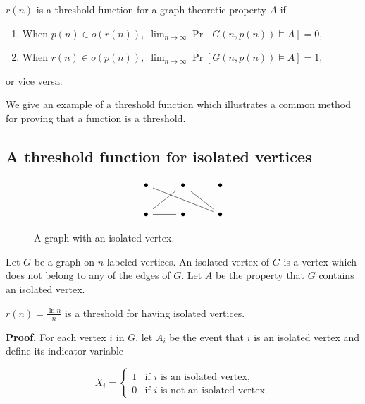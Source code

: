 \begin{definition}\label{def:probmet:threshold}
    $r(n)$ is a threshold function for a graph theoretic property $A$ if 
    \begin{enumerate}
        \item When \(p(n) \in o(r(n)), \; \lim_{n \to \infty} \Pr[G(n, p(n)) \vDash A] = 0,\)
        \item When \(r(n) \in o(p(n)), \;  \lim_{n \to \infty} \Pr[G(n, p(n)) \vDash A] = 1,\) 
    \end{enumerate}
    or vice versa.
\end{definition}

We give an example of a threshold function which illustrates a common method for proving that a function is a threshold. \par

\subsection{A threshold function for isolated vertices}

\begin{figure}[h]
    \[\begin{tikzcd}
        \bullet & \bullet & \bullet \\
        \bullet & \bullet & \bullet
        \arrow[no head, from=2-1, to=1-2]
        \arrow[no head, from=2-1, to=2-2]
        \arrow[no head, from=1-2, to=2-3]
        \arrow[no head, from=2-3, to=1-1]
    \end{tikzcd}\]
    \caption{A graph with an isolated vertex.}
    \label{fig:isolatedvertex}
\end{figure}

Let $G$ be a graph on $n$ labeled vertices. An isolated vertex of $G$ is a vertex which does not belong to any of the edges of $G$. Let $A$ be the property that $G$ contains an isolated vertex.

\begin{theorem}\label{thm:probmet:isolatedverticesthreshold}
    $\displaystyle{r(n) = \frac{\ln n}{n}}$ is a threshold for having isolated vertices. 
\end{theorem}

\textbf{Proof. } For each vertex $i$ in $G$, let $A_i$ be the event that $i$ is an isolated vertex and define its indicator variable 

\[X_i = 
\left\{
	\begin{array}{ll}
		1  & \mbox{if } i \text{ is an isolated vertex,} \\
		0 & \mbox{if } i \text{ is not an isolated vertex.}
	\end{array}
\right.
\]

